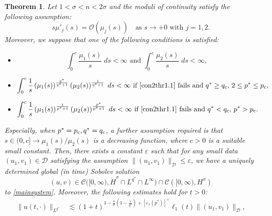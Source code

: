 \documentclass[11pt,reqno]{amsart}
\newcommand{\di}{\displaystyle}
\newcommand{\tron}[1]{\left( #1 \right)}
\numberwithin{equation}{section}
\newtheorem{theorem}{Theorem}[section]
\begin{document}
\begin{theorem}\label{thr1.1}
    Let $1<\sigma<n<2\sigma$ and the moduli of continuity satisfy the following assumption:
     \begin{equation}\label{con1thr1.1}
        s\mu'_{j}(s)=\mathcal{O}(\mu_j(s))\quad \text{as $s\to +0$ with $j=1,2$.}
    \end{equation}
    Moreover, we suppose that one of the following conditions is satisfied:
    \begin{itemize}
        \item[\rm i)] 
        \begin{equation}\label{con2thr1.1}
            \di\int_{0}^c\frac{\mu_1(s)}{s}\;ds<\infty \text{ and }\di\int_{0}^c\frac{\mu_2(s)}{s}\;ds<\infty,
        \end{equation}
        \item[\rm ii)] 
            \begin{equation}
            \di\int_{0}^c\frac{1}{s}\tron{\mu_1(s)}^{\frac{q^*}{q^*+1}}\tron{\mu_2(s)}^{\frac{1}{q^*+1}}\;ds<\infty \text{ if }\eqref{con2thr1.1} \text{ fails and }q^*\geq q_{\rm c},\,2\leq p^*\leq p_{\rm c}, \label{con3athr1.1}
            \end{equation}
        \item[\rm iii)] 
            \begin{equation}
            \di\int_{0}^c\frac{1}{s}\tron{\mu_1(s)}^{\frac{1}{p^*+1}}\tron{\mu_2(s)}^{\frac{p^*}{p^*+1}}\;ds<\infty\text{ if }\eqref{con2thr1.1} \text{ fails and }q^*< q_{\rm c},\, p^*>p_{\rm c}.\label{con3bthr1.1}
            \end{equation}    
    \end{itemize}
    Especially, when $p^*=p_{\rm c},q^*=q_{\rm c}$, a further assumption required is that $s\in (0,c]\to \mu_1(s)/\mu_2(s)$ is a decreasing function, where $c>0$ is a suitable small constant. Then, there exists a constant $\varepsilon$ such that for any small data $\left(u_1, v_1\right) \in \mathcal{D}$ satisfying the assumption $\|(u_1,v_1)\|_{\mathcal{D}}\leq\varepsilon$, we have a uniquely determined global (in time) Sobolev solution
$$
(u, v) \in \mathcal{C}\big([0, \infty),\dot{H}^{\sigma}\cap L^{q^*}\cap L^{\infty}\big)\cap \mathcal{C}\left([0,\infty),H^{\sigma}\right)
$$
to \eqref{mainsystem}. Moreover, the following estimates hold for $t>0$:
$$
\begin{aligned}
\|u(t,\cdot)\|_{L^{q^*}} &\lesssim (1+t)^{1-\frac{n}{\sigma}\tron{1-\frac{1}{q^*}}+[\varepsilon_1(p^*)]^{+}}\ell_1(t)\|(u_1,v_1)\|_{\mathcal{D}},\\

\end{aligned}$$
\end{theorem}
\end{document}
